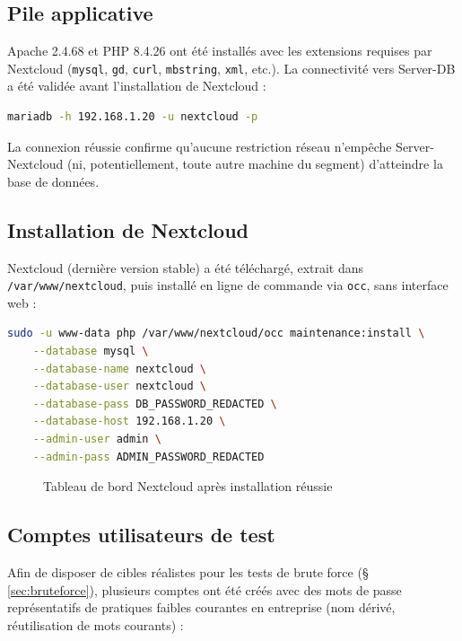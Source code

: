 \subsection{Pile applicative}

Apache 2.4.68 et PHP 8.4.26 ont été installés avec les extensions
requises par Nextcloud (\texttt{mysql}, \texttt{gd}, \texttt{curl},
\texttt{mbstring}, \texttt{xml}, etc.). La connectivité vers Server-DB a
été validée avant l'installation de Nextcloud :

\begin{lstlisting}[language=bash, caption={Test de connexion à la base de données distante}]
mariadb -h 192.168.1.20 -u nextcloud -p
\end{lstlisting}

La connexion réussie confirme qu'aucune restriction réseau n'empêche
Server-Nextcloud (ni, potentiellement, toute autre machine du segment)
d'atteindre la base de données.

\subsection{Installation de Nextcloud}

Nextcloud (dernière version stable) a été téléchargé, extrait dans
\texttt{/var/www/nextcloud}, puis installé en ligne de commande via
\texttt{occ}, sans interface web :

\begin{lstlisting}[language=bash, caption={Installation de Nextcloud via occ}]
sudo -u www-data php /var/www/nextcloud/occ maintenance:install \
    --database mysql \
    --database-name nextcloud \
    --database-user nextcloud \
    --database-pass DB_PASSWORD_REDACTED \
    --database-host 192.168.1.20 \
    --admin-user admin \
    --admin-pass ADMIN_PASSWORD_REDACTED
\end{lstlisting}

\begin{figure}[h]
\centering
\caption{Tableau de bord Nextcloud après installation réussie}
\label{fig:nextcloud-dashboard}
\end{figure}

\subsection{Comptes utilisateurs de test}

Afin de disposer de cibles réalistes pour les tests de brute force
(\S\,\ref{sec:bruteforce}), plusieurs comptes ont été créés avec des
mots de passe représentatifs de pratiques faibles courantes en
entreprise (nom dérivé, réutilisation de mots courants) :


